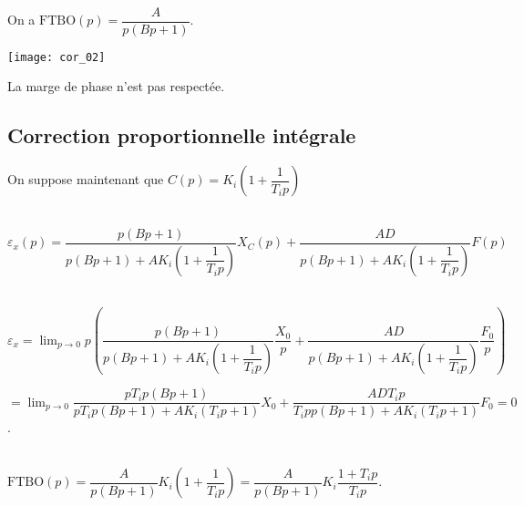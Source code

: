 \ifprof
\begin{corrige}~\\
On a $\text{FTBO}(p)=\dfrac{A}{p\left(Bp+1\right)}$.
\begin{center}
\texttt{[image: cor\_02]}
\end{center}

La marge de phase n'est pas respectée. 

\end{corrige}
\else
\fi

\subsection*{Correction proportionnelle intégrale}
On suppose maintenant que $C(p)=K_i\left(1+\dfrac{1}{T_ip}\right)$


\ifprof
\begin{corrige}~\\


$\varepsilon_x(p) =\dfrac{p\left(Bp+1 \right)}{p\left(Bp+1 \right)+AK_i\left(1+\dfrac{1}{T_ip}\right)}X_C(p)+\dfrac{AD }{p\left(Bp+1 \right)+AK_i\left(1+\dfrac{1}{T_ip}\right)} F(p) $

\end{corrige}
\else
\fi




\ifprof
\begin{corrige}~\\

$\varepsilon_x =\lim_{p\to 0} p\left(\dfrac{p\left(Bp+1 \right)}{p\left(Bp+1 \right)+AK_i\left(1+\dfrac{1}{T_ip}\right)}\dfrac{X_0}{p}+\dfrac{AD }{p\left(Bp+1 \right)+AK_i\left(1+\dfrac{1}{T_ip}\right)} \dfrac{F_0}{p}\right) $

$=\lim_{p\to 0} \dfrac{pT_ip\left(Bp+1 \right)}{pT_ip\left(Bp+1 \right)+AK_i\left(T_ip+1\right)}X_0+\dfrac{ADT_ip }{T_ipp\left(Bp+1 \right)+AK_i\left(T_ip+1\right)} F_0  = 0$.


\end{corrige}
\else
\fi


\ifprof
\begin{corrige}~\\
$\text{FTBO}(p)= \dfrac{A}{p\left(Bp+1\right)}K_i\left(1+\dfrac{1}{T_ip}\right)= \dfrac{A}{p\left(Bp+1\right)}K_i\dfrac{1+T_ip}{T_ip}$.


\end{corrige}
\else
\fi

